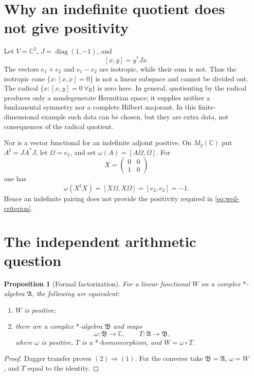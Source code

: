\documentclass[11pt]{article}
\newtheorem{proposition}[theorem]{Proposition}
\theoremstyle{definition}
\theoremstyle{remark}
\numberwithin{equation}{section}
\newcommand{\C}{\mathbb C}
\begin{document}
\section{Why an indefinite quotient does not give positivity}

Let $V=\C^2$, $J=\operatorname{diag}(1,-1)$, and
\[
 [x,y]=y^*Jx.
\]
The vectors $e_1+e_2$ and $e_1-e_2$ are isotropic, while their sum is
not.  Thus the isotropic cone $\{x:[x,x]=0\}$ is not a linear subspace
and cannot be divided out.  The radical
$\{x:[x,y]=0\ \forall y\}$ is zero here.  In general, quotienting by the
radical produces only a nondegenerate Hermitian space; it supplies
neither a fundamental symmetry nor a complete Hilbert majorant.  In this
finite-dimensional example such data can be chosen, but they are extra
data, not consequences of the radical quotient.

Nor is a vector functional for an indefinite adjoint positive.  On
$M_2(\C)$ put $A^\sharp=JA^*J$, let $\Omega=e_1$, and set
$\omega(A)=[A\Omega,\Omega]$.  For
\[
 X=\begin{pmatrix}0&0\\1&0\end{pmatrix}
\]
one has
\begin{equation}
 \omega(X^\sharp X)=[X\Omega,X\Omega]=[e_2,e_2]=-1.
 \label{eq:indefinite-negative}
\end{equation}
Hence an indefinite pairing does not provide the positivity required in
\eqref{eq:weil-criterion}.

\section{The independent arithmetic question}

\begin{proposition}[Formal factorization]
For a linear functional $W$ on a complex $*$-algebra $\mathfrak A$, the
following are equivalent:
\begin{enumerate}
\item $W$ is positive;
\item there are a complex $*$-algebra $\mathfrak B$ and maps
\[
 \omega:\mathfrak B\longrightarrow\C,
 \qquad T:\mathfrak A\longrightarrow\mathfrak B,
\]
where $\omega$ is positive, $T$ is a $*$-homomorphism, and
$W=\omega\circ T$.
\end{enumerate}
\end{proposition}

\begin{proof}
Dagger transfer proves $(2)\Rightarrow(1)$.  For the converse take
$\mathfrak B=\mathfrak A$, $\omega=W$, and $T$ equal to the identity.
\end{proof}
\end{document}
